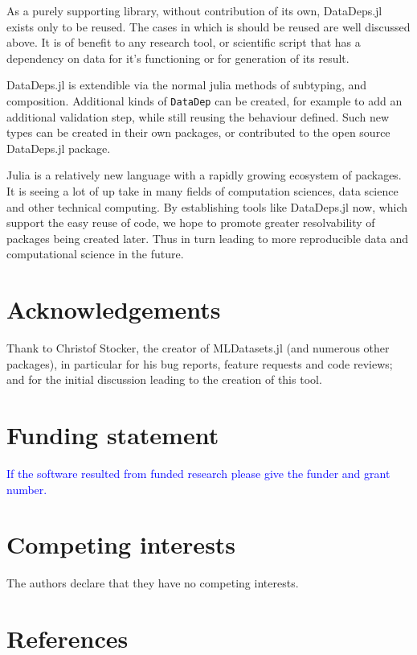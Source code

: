 \documentclass{jors}
\begin{document}
As a purely supporting library, without contribution of its own, DataDeps.jl exists only to be reused.
The cases in which is should be reused are well discussed above.
It is of benefit to any research tool, or scientific script that has a dependency on data for it's functioning or for generation of its result.


DataDeps.jl is extendible via the normal julia methods of subtyping, and composition.
Additional kinds of \texttt{DataDep} can be created, for example to add an additional validation step,
while still reusing the behaviour defined.
Such new types can be created in their own packages, or contributed to the open source DataDeps.jl package.


Julia is a relatively new language with a rapidly growing ecosystem of packages.
It is seeing a lot of up take in many fields of computation sciences, data science and other technical computing.
By establishing tools like DataDeps.jl now, which support the easy reuse of code,
we hope to promote greater resolvability of packages being created later.
Thus in turn leading to more reproducible data and computational science in the future.

\section*{Acknowledgements}
Thank to Christof Stocker, the creator of MLDatasets.jl (and numerous other packages), in particular for his bug reports, feature requests and code reviews; and for the initial discussion leading to the creation of this tool.

\section*{Funding statement}

\textcolor{blue}{If the software resulted from funded research please give the funder and grant number.}

\section*{Competing interests}
The authors declare that they have no competing interests.

\section*{References}
\end{document}
